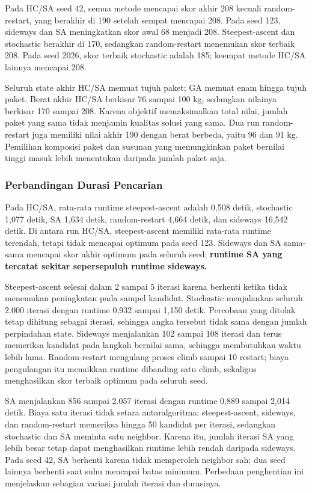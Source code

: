\documentclass[12pt,a4paper]{article}
\begin{document}
Pada HC/SA seed 42, semua metode mencapai skor akhir 208 kecuali random-restart, yang berakhir di 190 setelah sempat mencapai 208. Pada seed 123, sideways dan SA meningkatkan skor awal 68 menjadi 208. Steepest-ascent dan stochastic berakhir di 170, sedangkan random-restart menemukan skor terbaik 208. Pada seed 2026, skor terbaik stochastic adalah 185; keempat metode HC/SA lainnya mencapai 208.

Seluruh state akhir HC/SA memuat tujuh paket; GA memuat enam hingga tujuh paket. Berat akhir HC/SA berkisar 76 sampai 100 kg, sedangkan nilainya berkisar 170 sampai 208. Karena objektif memaksimalkan total nilai, jumlah paket yang sama tidak menjamin kualitas solusi yang sama. Dua run random-restart juga memiliki nilai akhir 190 dengan berat berbeda, yaitu 96 dan 91 kg. Pemilihan komposisi paket dan susunan yang memungkinkan paket bernilai tinggi masuk lebih menentukan daripada jumlah paket saja.

\subsubsection{Perbandingan Durasi Pencarian}
Pada HC/SA, rata-rata runtime steepest-ascent adalah 0,508 detik, stochastic 1,077 detik, SA 1,634 detik, random-restart 4,664 detik, dan sideways 16,542 detik. Di antara run HC/SA, steepest-ascent memiliki rata-rata runtime terendah, tetapi tidak mencapai optimum pada seed 123. Sideways dan SA sama-sama mencapai skor akhir optimum pada seluruh seed; \textbf{runtime SA yang tercatat sekitar sepersepuluh runtime sideways.}

Steepest-ascent selesai dalam 2 sampai 5 iterasi karena berhenti ketika tidak menemukan peningkatan pada sampel kandidat. Stochastic menjalankan seluruh 2.000 iterasi dengan runtime 0,932 sampai 1,150 detik. Percobaan yang ditolak tetap dihitung sebagai iterasi, sehingga angka tersebut tidak sama dengan jumlah perpindahan state. Sideways menjalankan 102 sampai 108 iterasi dan terus memeriksa kandidat pada langkah bernilai sama, sehingga membutuhkan waktu lebih lama. Random-restart mengulang proses climb sampai 10 restart; biaya pengulangan itu menaikkan runtime dibanding satu climb, sekaligus menghasilkan skor terbaik optimum pada seluruh seed.

SA menjalankan 856 sampai 2.057 iterasi dengan runtime 0,889 sampai 2,014 detik. Biaya satu iterasi tidak setara antaralgoritma: steepest-ascent, sideways, dan random-restart memeriksa hingga 50 kandidat per iterasi, sedangkan stochastic dan SA meminta satu neighbor. Karena itu, jumlah iterasi SA yang lebih besar tetap dapat menghasilkan runtime lebih rendah daripada sideways. Pada seed 42, SA berhenti karena tidak memperoleh neighbor sah; dua seed lainnya berhenti saat suhu mencapai batas minimum. Perbedaan penghentian ini menjelaskan sebagian variasi jumlah iterasi dan durasinya.
\end{document}
